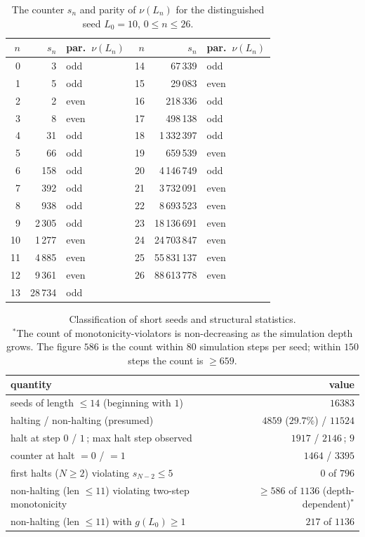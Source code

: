 \documentclass[11pt,reqno]{amsart}
\theoremstyle{plain}
\theoremstyle{definition}
\theoremstyle{remark}
\begin{document}
\begin{table}[h]\centering
\begin{tabular}{rrl|rrl}
$n$ & $s_n$ & par.\ $\nu(L_n)$ & $n$ & $s_n$ & par.\ $\nu(L_n)$\\
\hline
0 & 3 & odd & 14 & 67\,339 & odd\\
1 & 5 & odd & 15 & 29\,083 & even\\
2 & 2 & even & 16 & 218\,336 & odd\\
3 & 8 & even & 17 & 498\,138 & odd\\
4 & 31 & odd & 18 & 1\,332\,397 & odd\\
5 & 66 & odd & 19 & 659\,539 & even\\
6 & 158 & odd & 20 & 4\,146\,749 & odd\\
7 & 392 & odd & 21 & 3\,732\,091 & even\\
8 & 938 & odd & 22 & 8\,693\,523 & even\\
9 & 2\,305 & odd & 23 & 18\,136\,691 & even\\
10 & 1\,277 & even & 24 & 24\,703\,847 & even\\
11 & 4\,885 & even & 25 & 55\,831\,137 & even\\
12 & 9\,361 & even & 26 & 88\,613\,778 & even\\
13 & 28\,734 & odd & & &
\end{tabular}
\caption{The counter $s_n$ and parity of $\nu(L_n)$ for the distinguished seed $L_0=10$, $0\le n\le 26$.}
\label{tab:traj}
\end{table}

\begin{table}[h]\centering
\begin{tabular}{lr}
quantity & value\\
\hline
seeds of length $\le 14$ (beginning with $1$) & $16383$\\
halting / non-halting (presumed) & $4859$ ($29.7\%$) / $11524$\\
halt at step $0$ / $1$\,; max halt step observed & $1917$ / $2146$\,; $9$\\
counter at halt $=0$ / $=1$ & $1464$ / $3395$\\
first halts ($N\ge 2$) violating $s_{N-2}\le 5$ & $0$ of $796$\\
non-halting (len $\le 11$) violating two-step monotonicity & $\ge 586$ of $1136$ (depth-dependent)$^*$\\
non-halting (len $\le 11$) with $g(L_0)\ge 1$ & $217$ of $1136$\\
\end{tabular}
\caption{Classification of short seeds and structural statistics.\\
$^*${\small The count of monotonicity-violators is non-decreasing as the simulation depth grows. The figure $586$ is the count within $80$ simulation steps per seed; within $150$ steps the count is $\ge 659$.}}
\label{tab:stats}
\end{table}
\end{document}
